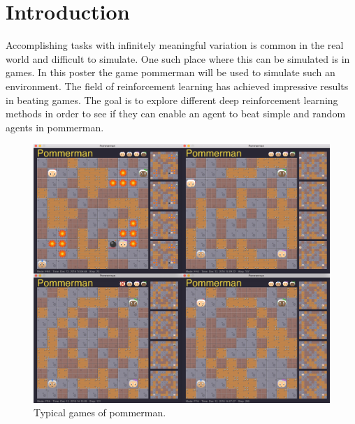 \section{Introduction}
\label{sec:intro}




Accomplishing tasks with infinitely meaningful variation is common in the real world and difficult to simulate. One such place where this can be simulated is in games. In this poster the game pommerman will be used to simulate such an environment. The field of reinforcement learning has achieved impressive results in beating games.\cite{mnih2015a}\cite{silver2016a} The goal is to explore different deep reinforcement learning methods in order to see if they can enable an agent to beat simple and random agents in pommerman.

\begin{figure}[htb]
    \centerline{\includegraphics[width=0.7\linewidth]{docs/article/inputs/4pommerview.jpg}}
    \caption{Typical games of pommerman.}
    \label{fig:pomIntro}
\end{figure}